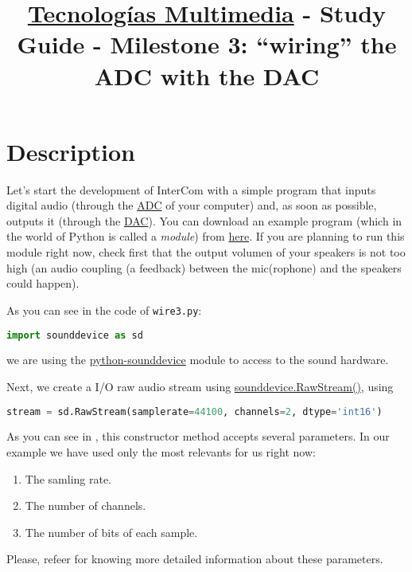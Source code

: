 \title{\href{https://www.ual.es/estudios/grados/presentacion/plandeestudios/asignatura/4015/40154321?idioma=zh_CN}{Tecnologías Multimedia} - Study Guide - Milestone 3: ``wiring'' the ADC with the DAC}

\maketitle

\section{Description}

Let's start the development of InterCom with a simple program that
inputs digital audio (through
the \href{https://en.wikipedia.org/wiki/Analog-to-digital_converter}{ADC}
of your computer) and, as soon as possible, outputs it (through
the \href{https://en.wikipedia.org/wiki/Digital-to-analog_converter}{DAC}). You
can download an example program (which in the world of Python is
called a \emph{module})
from \href{https://github.com/Tecnologias-multimedia/intercom/blob/master/test/sounddevice/wire3.py}{here}. If
you are planning to run this module right now, check first that the
output volumen of your speakers is not too high (an audio coupling (a
feedback) between the mic(rophone) and the speakers could happen).

As you can see in the code of \texttt{wire3.py}:

\begin{lstlisting}[language=Python]
import sounddevice as sd
\end{lstlisting}

we are using the
\href{https://python-sounddevice.readthedocs.io/en/latest/}{python-sounddevice}
\cite{sounddevice} module to access to the sound hardware.

Next, we create a I/O raw audio stream
using \href{https://python-sounddevice.readthedocs.io/en/latest/api/raw-streams.html#sounddevice.RawStream}{sounddevice.RawStream()},
using
\begin{lstlisting}[language=Python]
stream = sd.RawStream(samplerate=44100, channels=2, dtype='int16')
\end{lstlisting}

As you can see in \cite{sounddevice}, this constructor method accepts
several parameters. In our example we have used only the most
relevants for us right now:
\begin{enumerate}
\item The samling rate.
\item The number of channels.
\item The number of bits of each sample.
\end{enumerate}
Please, refeer \cite{harmonic-analysis} for knowing more detailed
information about these parameters.

